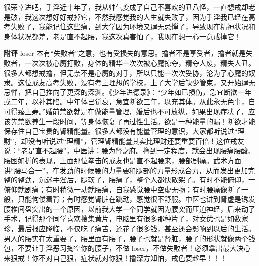 \begin{case}
    很荣幸进吧，手淫近十年了，我从帅气变成了自己不喜欢的丑八怪，一直想戒却老是破，我这次想好好戒掉它，不然我感觉我的人生就失败了，因为手淫我已经在高考失败了，我能记住这些痛，到大学因为环境又肆无忌惮了，导致现在精神状况和身体状况都差，老是直不起腰，我这次真害怕了，我现在想一心一意戒掉它！

    \textbf{附评} loser 本有“失败者”之意，也有受损失的意思。撸者不是享受者，撸者就是失败者，一次次被心魔打败，身体的精华一次次被心魔掠夺，精夺人废，精失人丑。很多人都想戒撸，但无奈不是心魔的对手，所以只能一次次妥协，沦为了心魔的奴隶。这位戒友高考失败，没有考上理想的学校，上了大学后缺少管束，又开始肆无忌惮，把自己推向了更深的深渊。《少年进德录》：“少年如已损伤，急宜断欲一年或二年，以补其陷。中年体已觉衰，急宜断欲三年，以充其体。从此永无色事，自可得臻上寿。”婚前禁欲就是在做能量管理，婚后也不可放纵，如果出现症状了，应该先禁欲养生一段时间，等身体恢复了再过性生活。欲是一种能量的漏！断欲才能保存住自己宝贵的肾精能量。很多人都没有能量管理的意识，大家都听说过“理财”，却没有听说过“理精”，管理肾精能量其实比理财还要重要百倍！这位戒友说：“老是直不起腰”，中医讲：腰为肾之府。撸到一定程度，就会出现腰痛腰酸、腰困如折的表现，上面那位拳击的戒友也是直不起腰来，腰部剧痛。武术方面讲“腰马合一”，在发劲的时候腰的力量要和腿部的力量形成合力，从而发出更加完整的整劲，沉迷手淫后，腿软了，腰痛了，整个人都快散架了。有时不能俯仰，一俯仰就剧痛；有时稍微一动就腰痛，自我感觉腰中空虚无物；有时腰痛像断了一般，只能佝偻着背；有时感觉肾脏在跳动，感觉很不舒服。中医也讲到肾虚是诱发腰椎间盘突出的一个原因，以前我大学一个同学就因为腰突而压迫神经，后来动了手术，记得那个同学喜欢搜集黄片，电脑里有很多那种片子，对女优也是如数家珍，最后报应降临，不仅吃了痛苦，还花了很多钱，甚至还会影响到以后的生活。男人的腰实在太重要了，腰里面有腰子，腰子也就是肾脏，腰子的形状就像两个钱包，不要让手淫恶习掏空你的腰子，不做 loser，不做失败者！必须拿出最大决心来狠戒！你不对自己狠，症状就对你狠！撸深方知怕，戒色要趁早！！！
\end{case}

